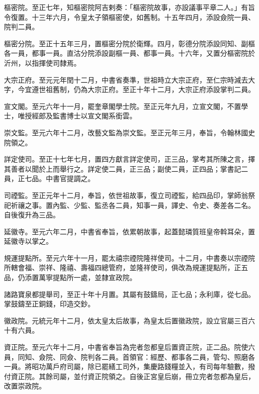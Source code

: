 \begin{pinyinscope}
 樞密院。至正七年，知樞密院阿吉剌奏：「樞密院故事，亦設議事平章二人。」有旨令復置。十三年六月，令皇太子領樞密使，如舊制。十五年四月，添設僉院一員、院判二員。



 樞密分院。至正十五年三月，置樞密分院於衛輝。四月，彰德分院添設同知、副樞各一員，都事一員。直沽分院添設副樞一員、都事一員。十六年，又置分樞密院於沂州，以指揮使司隸焉。



 大宗正府。至元元年閏十二月，中書省奏準，世祖時立大宗正府，至仁宗時減去大字，今宜遵世祖舊制，仍為大宗正府。至正十年十二月，大宗正府添設掌判二員。



 宣文閣。至元六年十一月，罷奎章閣學士院。至正元年九月，立宣文閣，不置學士，唯授經郎及監書博士以宣文閣系銜雲。



 崇文監。至元六年十二月，改藝文監為崇文監。至正元年三月，奉旨，令翰林國史院領之。



 詳定使司。至正十七年七月，置四方獻言詳定使司，正三品，掌考其所陳之言，擇其善者以聞於上而舉行之。詳定使二員，正三品；副使二員，正四品；掌書記二員，正七品。中書官提調之。



 司禋監。至正元年十二月，奉旨，依世祖故事，復立司禋監，給四品印，掌師翁祭祀祈禳之事。置內監、少監、監丞各二員，知事一員，譯史、令史、奏差各二名。自後復升為三品。



 延徽寺。至元六年二月，中書省奉旨，依累朝故事，起蓋懿璘質班皇帝斡耳朵，置延徽寺以掌之。



 規運提點所。至元六年十一月，罷太禧宗禋院隆祥使司。十二月，中書奏以宗禋院所轄會福、崇祥、隆禧、壽福四總管府，並隆祥使司，俱改為規運提點所，正五品，仍添置萬寧提點所一處，並隸宣政院。



 諸路寶泉都提舉司，至正十年十月置。其屬有鼓鑄局，正七品；永利庫，從七品。掌鼓鑄至正銅錢，印造交鈔。



 徽政院。元統元年十二月，依太皇太后故事，為皇太后置徽政院，設立官屬三百六十有六員。



 資正院。至元六年十二月，中書省奉旨為完者忽都皇后置資正院，正二品。院使六員，同知、僉院、同僉、院判各二員。首領官：經歷、都事各二員，管勾、照磨各一員。將昭功萬戶府司屬，除已罷繕工司外，集慶路錢糧並入，有司每年驗數，撥付資正院。其餘司屬，並付資正院領之。自後正宮皇后崩，冊立完者忽都為皇后，改置崇政院。




\end{pinyinscope}
